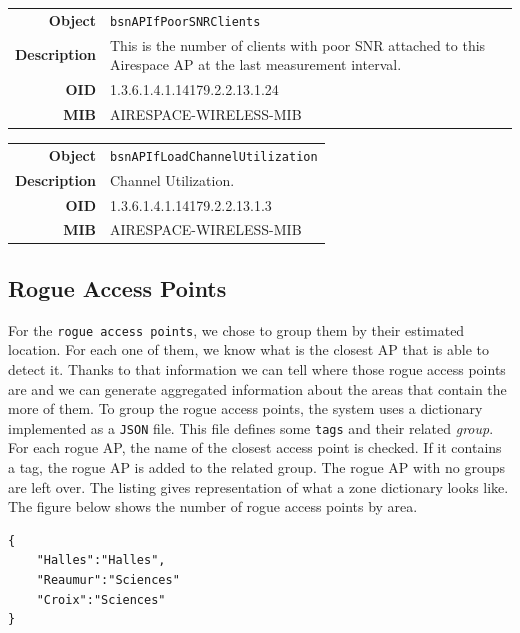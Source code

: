 \begin{tabular}{|r l|}
\hline
\textbf{Object} & \texttt{bsnAPIfPoorSNRClients} \\
\textbf{Description} & \parbox{11cm}{This is the number of clients with poor SNR attached to this Airespace AP at the last measurement interval.} \\
\textbf{OID} & 1.3.6.1.4.1.14179.2.2.13.1.24 \\
\textbf{MIB} & AIRESPACE-WIRELESS-MIB \\
\hline
\end{tabular}

\begin{tabular}{|r l|}
\hline
\textbf{Object} & \texttt{bsnAPIfLoadChannelUtilization} \\
\textbf{Description} & \parbox{11cm}{Channel Utilization.} \\
\textbf{OID} & 1.3.6.1.4.1.14179.2.2.13.1.3 \\
\textbf{MIB} & AIRESPACE-WIRELESS-MIB \\
\hline
\end{tabular}

\subsection{Rogue Access Points}
For the \texttt{rogue access points}, we chose to group them by their estimated location. For each one of them, we know what is the closest AP that is able to detect it. Thanks to that information we can tell where those rogue access points are and we can generate aggregated information about the areas that contain the more of them. To group the rogue access points, the system uses a dictionary implemented as a \texttt{JSON} file. This file defines some \texttt{tags} and their related \emph{group}. For each rogue AP, the name of the closest access point is checked. If it contains a tag, the rogue AP is added to the related group. The rogue AP with no groups are left over. The listing gives representation of what a zone dictionary looks like. The figure below shows the number of rogue access points by area.

\begin{lstlisting}[frame=single,breaklines=true,caption={Example of a Zone Dictionary}]
{
	"Halles":"Halles",
	"Reaumur":"Sciences"
	"Croix":"Sciences"	
}
\end{lstlisting}


